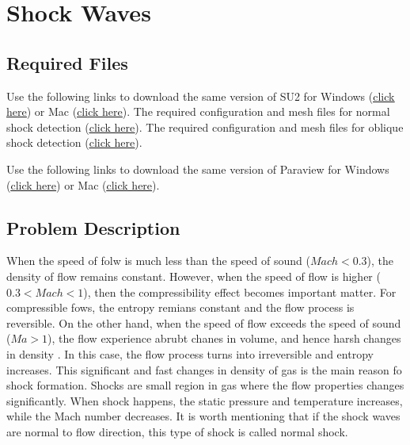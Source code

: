 \chapter{Shock Waves}
\label{ch:Shock Waves}
\section{Required Files}
\begin{su2note}
	Use the following links to download the same version of SU2 for Windows (\href{https://users.encs.concordia.ca/~bvermeir/book/executables/windows/SU2_Windows.zip}{\underline{click here}}) or Mac (\href{https://users.encs.concordia.ca/~bvermeir/book/executables/osx/SU2_Mac.zip}{\underline{click here}}).
	The required configuration and mesh files for normal shock detection (\href{https://gitlab.com/bvermeir/book-cfd/blob/master/tutorial/tut7_normal_shock/shock.zip}{\underline{click here}}).
	The required configuration and mesh files for oblique shock detection (\href{https://gitlab.com/bvermeir/book-cfd/blob/master/tutorial/tut7_oblique_shock/shock.zip}{\underline{click here}}).	
\end{su2note}
\begin{paraviewnote}
	Use the following links to download the same version of Paraview for Windows (\href{https://users.encs.concordia.ca/~bvermeir/book/executables/windows/ParaView-5.4.0-Qt5-OpenGL2-Windows-64bit.exe}{\underline{click here}}) or Mac (\href{https://users.encs.concordia.ca/~bvermeir/book/executables/osx/ParaView-5.4.0-Qt5-OpenGL2-MPI-OSX10.8-64bit.dmg}{\underline{click here}}).
\end{paraviewnote}

\section{Problem Description}
When the speed of folw is much less than the speed of sound ($Mach<0.3$), the density of flow remains constant. However, when the speed of flow is higher ($0.3<Mach<1$), then the compressibility effect becomes important matter. For compressible fows, the entropy remians constant and the flow process is reversible. On the other hand, when the speed of flow exceeds the speed of sound ($Ma>1$), the flow experience abrubt chanes in volume, and hence harsh changes in density . In this case, the flow process turns into irreversible and entropy increases. This significant and fast changes in density of gas is the main reason fo shock formation. Shocks are small region in gas where the flow properties changes significantly. When shock happens, the static pressure and temperature increases, while the Mach number decreases. It is worth mentioning that if the shock waves are normal to flow direction, this type of shock is called normal shock.

